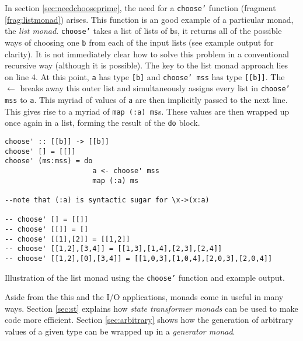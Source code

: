In section \ref{sec:needchooseprime}, the need for a \texttt{choose'} function (fragment \ref{frag:listmonad}) arises. This function is an good example of a particular {monad}, the \textit{list monad}. \texttt{choose'} takes a list of lists of \texttt{b}s, it returns all of the possible ways of choosing one \texttt{b} from each of the input lists (see example output for clarity). It is not immediately clear how to solve this problem in a conventional recursive way (although it is possible). The key to the list monad approach lies on line 4. At this point, \texttt{a} has type \texttt{[b]} and \texttt{choose' mss} has type \texttt{[[b]]}. The \texttt{$\leftarrow$} breaks away this outer list and simultaneously assigns every list in \texttt{choose' mss} to \texttt{a}. This myriad of values of \texttt{a} are then implicitly passed to the next line. This gives rise to a myriad of \texttt{map (:a) ms}s. These values are then wrapped up once again in a list, forming the result of the \texttt{do} block.


\begin{fragment}
\begin{lstlisting}
choose' :: [[b]] -> [[b]]
choose' [] = [[]]
choose' (ms:mss) = do
                     a <- choose' mss
                     map (:a) ms 

--note that (:a) is syntactic sugar for \x->(x:a)

-- choose' [] = [[]]
-- choose' [[]] = []                    
-- choose' [[1],[2]] = [[1,2]]
-- choose' [[1,2],[3,4]] = [[1,3],[1,4],[2,3],[2,4]]
-- choose' [[1,2],[0],[3,4]] = [[1,0,3],[1,0,4],[2,0,3],[2,0,4]]

\end{lstlisting}
\caption{Illustration of the {list monad} using the \texttt{choose'} function and example output.}
\label{frag:listmonad}
\end{fragment}



Aside from the this and the {I/O} applications, {monads} come in useful in many ways. Section \ref{sec:st} explains how \textit{state transformer monads} can be used to make code more efficient. Section \ref{sec:arbitrary} shows how the generation of arbitrary values of a given type can be wrapped up in a \textit{generator monad}. 

